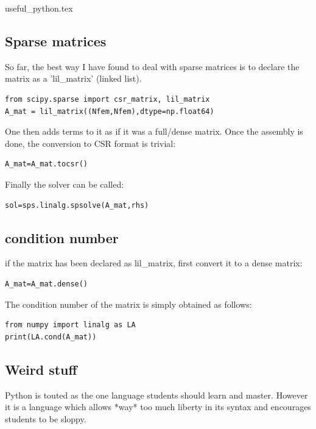 \begin{flushright} {\tiny {\color{gray} useful\_python.tex}} \end{flushright}

\subsection{Sparse matrices}

So far, the best way I have found to deal with sparse matrices is to 
declare the matrix as a 'lil\_matrix' (linked list).

\begin{lstlisting}
from scipy.sparse import csr_matrix, lil_matrix
A_mat = lil_matrix((Nfem,Nfem),dtype=np.float64)
\end{lstlisting}

One then adds terms to it as if it was a full/dense matrix. 
Once the assembly is done, the conversion to CSR format is trivial:

\begin{lstlisting}
A_mat=A_mat.tocsr()
\end{lstlisting}

Finally the solver can be called:

\begin{lstlisting}
sol=sps.linalg.spsolve(A_mat,rhs)
\end{lstlisting}

\subsection{condition number}

if the matrix has been declared as lil\_matrix, first convert it to a dense matrix:
\begin{lstlisting}
A_mat=A_mat.dense()
\end{lstlisting}
The condition number of the matrix is simply obtained as follows:
\begin{lstlisting}
from numpy import linalg as LA
print(LA.cond(A_mat))
\end{lstlisting}

\subsection{Weird stuff}

Python is touted as the one language students should learn and master. However it is a language which allows *way* too much liberty in its syntax and encourages students to be sloppy. 

